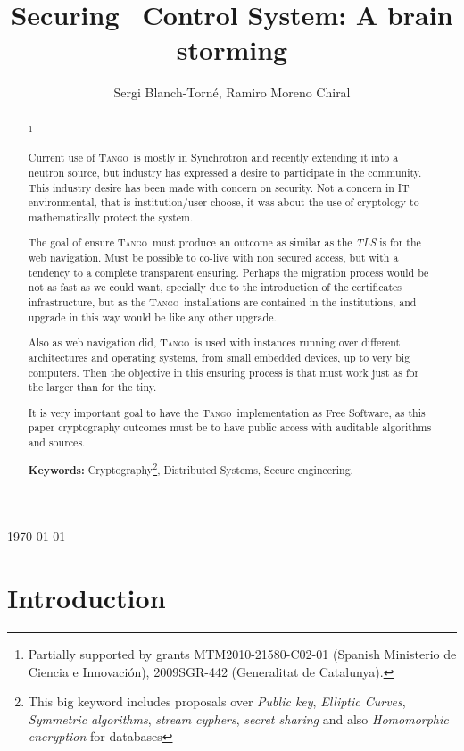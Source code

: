 \documentclass[10pt,a4paper,twoside]{llncs}
\title{Securing \tango\, Control System: A brain storming}
\author{Sergi Blanch-Torn\'e\inst{1}, Ramiro Moreno Chiral\inst{2}}
\institute{
 Escola Polit\`ecnica Superior, Universitat de Lleida. Spain.\\
 \email{\tt sblanch@alumnes.udl.es}
 \and 
 Departament de Matem\`atica. Universitat de Lleida. Spain.\\
 \email{\tt ramiro@matematica.udl.es}
 }
\newcommand{\version}{}%
\newcommand{\tango}{\textsc{Tango}}
\begin{document}
\maketitle
\begin{center}
 \today\\
 \version
\end{center}


\begin{abstract}\footnote{Partially supported by grants MTM2010-21580-C02-01 (Spanish Ministerio de Ciencia e Innovaci\'on), 2009SGR-442 (Generalitat de Catalunya).}

Current use of \tango\, is mostly in Synchrotron and recently extending it into a neutron source, but industry has expressed a desire to participate in the community. This industry desire has been made with concern on security. Not a concern in IT environmental, that is institution/user choose, it was about the use of cryptology to mathematically protect the system.

The goal of ensure \tango\, must produce an outcome as similar as the \emph{TLS} is for the web navigation. Must be possible to co-live with non secured access, but with a tendency to a complete transparent ensuring. Perhaps the migration process would be not as fast as we could want, specially due to the introduction of the certificates infrastructure, but as the \tango\, installations are contained in the institutions, and upgrade in this way would be like any other upgrade.

Also as web navigation did, \tango\, is used with instances running over different architectures and operating systems, from small embedded devices, up to very big computers. Then the objective in this ensuring process is that must work just as for the larger than for the tiny.

It is very important goal to have the \tango\, implementation as Free Software, as this paper cryptography outcomes must be to have public access with auditable algorithms and sources.
   
{\bf Keywords:} Cryptography\footnote{This big keyword includes proposals over \emph{Public key}, \emph{Elliptic Curves}, \emph{Symmetric algorithms}, \emph{stream cyphers}, \emph{secret sharing} and also \emph{Homomorphic encryption} for databases}, Distributed Systems, Secure engineering.

\end{abstract}

%
\section{Introduction \label{sec:intro}}
\end{document}
